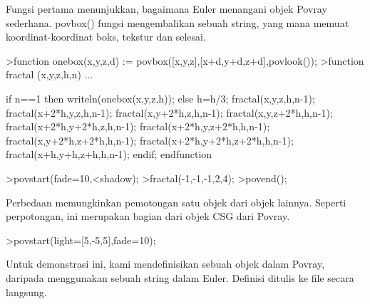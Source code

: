 \documentclass[a4paper,10pt]{article}
\begin{document}
\begin{eulernotebook}
\begin{eulercomment}
Fungsi pertama menunjukkan, bagaimana Euler menangani objek Povray
sederhana. povbox() fungsi mengembalikan sebuah string, yang mana
memuat koordinat-koordinat boks, tekstur dan selesai.
\end{eulercomment}
\begin{eulerprompt}
>function onebox(x,y,z,d) := povbox([x,y,z],[x+d,y+d,z+d],povlook());
>function fractal (x,y,z,h,n) ...
\end{eulerprompt}
\begin{eulerudf}
   if n==1 then writeln(onebox(x,y,z,h));
   else
     h=h/3;
     fractal(x,y,z,h,n-1);
     fractal(x+2*h,y,z,h,n-1);
     fractal(x,y+2*h,z,h,n-1);
     fractal(x,y,z+2*h,h,n-1);
     fractal(x+2*h,y+2*h,z,h,n-1);
     fractal(x+2*h,y,z+2*h,h,n-1);
     fractal(x,y+2*h,z+2*h,h,n-1);
     fractal(x+2*h,y+2*h,z+2*h,h,n-1);
     fractal(x+h,y+h,z+h,h,n-1);
   endif;
  endfunction
\end{eulerudf}
\begin{eulerprompt}
>povstart(fade=10,<shadow);
>fractal(-1,-1,-1,2,4);
>povend();
\end{eulerprompt}
\begin{eulercomment}
Perbedaan memungkinkan pemotongan satu objek dari objek lainnya.
Seperti perpotongan, ini merupakan bagian dari objek CSG dari Povray.
\end{eulercomment}
\begin{eulerprompt}
>povstart(light=[5,-5,5],fade=10);
\end{eulerprompt}
\begin{eulercomment}
Untuk demonstrasi ini, kami mendefinisikan sebuah objek dalam Povray,
daripada menggunakan sebuah string dalam Euler. Definisi ditulis ke
file secara langsung.


\end{eulercomment}
\end{eulernotebook}
\end{document}
